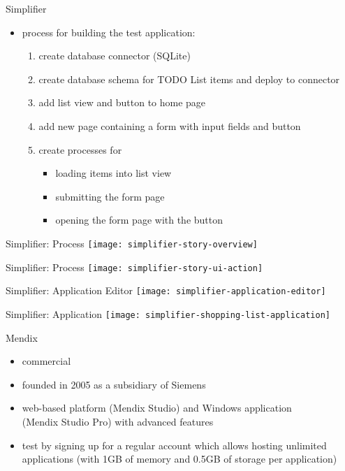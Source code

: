 \documentclass[aspectratio=169]{beamer}
\begin{document}
  \begin{frame}{Simplifier}
    \begin{itemize}
      \item process for building the test application:
        \begin{enumerate}
          \item create database connector (SQLite)
          \item create database schema for TODO List items and deploy to connector
          \item add list view and button to home page
          \item add new page containing a form with input fields and button
          \item create processes for
            \begin{itemize}
              \item loading items into list view
              \item submitting the form page
              \item opening the form page with the button
            \end{itemize}
        \end{enumerate}
    \end{itemize}
  \end{frame}

  \begin{frame}[standout]{Simplifier: Process}
    \texttt{[image: simplifier-story-overview]}
  \end{frame}

  \begin{frame}[standout]{Simplifier: Process}
    \texttt{[image: simplifier-story-ui-action]}
  \end{frame}

  \begin{frame}[standout]{Simplifier: Application Editor}
    \texttt{[image: simplifier-application-editor]}
  \end{frame}

  \begin{frame}[standout]{Simplifier: Application}
    \texttt{[image: simplifier-shopping-list-application]}
  \end{frame}

  \begin{frame}{Mendix}
    \begin{itemize}
      \item commercial
      \item founded in 2005 as a subsidiary of Siemens
      \item web-based platform (Mendix Studio) and Windows application \\
            (Mendix Studio Pro) with advanced features
      \item test by signing up for a regular account which allows hosting unlimited applications (with 1GB of memory and 0.5GB of storage per application)
    \end{itemize}
  \end{frame}
\end{document}
